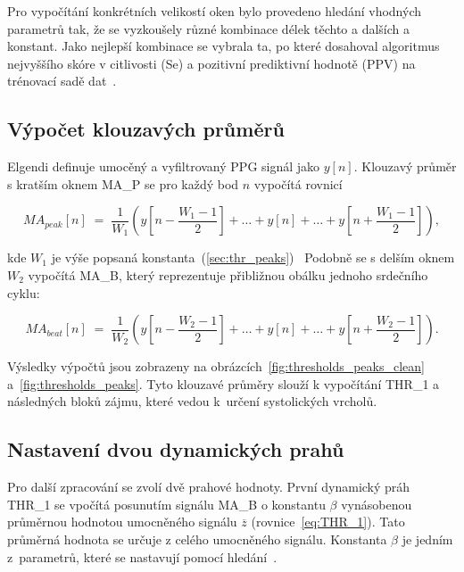 Pro vypočítání konkrétních velikostí oken bylo provedeno  hledání vhodných parametrů tak, že se vyzkoušely různé kombinace délek těchto a dalších a konstant.
Jako nejlepší kombinace se vybrala ta, po které dosahoval algoritmus nejvyššího skóre v citlivosti (\acs{Se}) a pozitivní prediktivní hodnotě (\acs{PPV}) na trénovací sadě dat~\cite{Elgendi2013}.

\subsection*{Výpočet klouzavých průměrů} %
\label{sec:MA}

Elgendi definuje umocěný a vyfiltrovaný \acs{PPG} signál jako \(y[n]\).
Klouzavý průměr s kratším oknem \acs{MA_P} se pro každý bod \(n\) vypočítá rovnicí

\begin{equation}
	MA_{peak}[n] \;=\;
	\frac{1}{W_1}
	(y[n - \frac{W_1-1}{2}] + \ldots + y[n] + \ldots + y[n + \frac{W_1-1}{2}]),
	\label{eq:MA_P}
\end{equation}

kde \(W_1\) je výše popsaná konstanta~(\ref{sec:thr_peaks})~\cite{Elgendi2013}
Podobně se s delším oknem \(W_2\) vypočítá \acs{MA_B}, který reprezentuje přibližnou obálku jednoho srdečního cyklu:

\begin{equation}
	MA_{beat}[n] \;=\;
	\frac{1}{W_2}
	(y[n - \frac{W_2-1}{2}] + \ldots + y[n] + \ldots + y[n + \frac{W_2-1}{2}]).
	\label{eq:MA_B}
\end{equation}

Výsledky výpočtů jsou zobrazeny na obrázcích~\ref{fig:thresholds_peaks_clean} a~\ref{fig:thresholds_peaks}.
Tyto klouzavé průměry slouží k vypočítání \acs{THR_1} a následných bloků zájmu, které vedou k~určení systolických vrcholů.

\subsection*{Nastavení dvou dynamických prahů}
\label{sec:thresholds}

Pro další zpracování se zvolí dvě prahové hodnoty.
První dynamický práh \acs{THR_1} se vpočítá posunutím signálu \acs{MA_B} o konstantu \(\beta\) vynásobenou průměrnou hodnotou umocněného signálu \(\overline{z}\) (rovnice~\ref{eq:THR_1}).
Tato průměrná hodnota se určuje z celého umocněného signálu.
Konstanta \(\beta\) je jedním z~parametrů, které se nastavují pomocí  hledání~\cite{Elgendi2013}.

